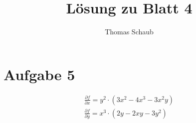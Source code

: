 \documentclass{scrartcl}
\title{Lösung zu Blatt 4}
\author{Thomas Schaub}
\begin{document}
\maketitle

\section{Aufgabe 5}

\begin{align*}
\frac{\partial f}{\partial x} = y^2 \cdot (3x^2 - 4x^3 - 3x^2y) \\
\frac{\partial f}{\partial y} = x^3 \cdot (2y - 2xy - 3y^2)
\end{align*}
\end{document}
